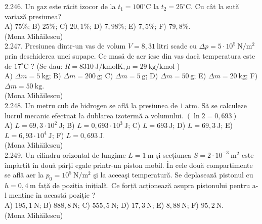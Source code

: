 \documentclass[10pt]{article}
\begin{document}
2.246. Un gaz este răcit izocor de la $t_{1}=100^{\circ} \mathrm{C}$ la $t_{2}=25^{\circ} \mathrm{C}$. Cu cât la sută variază presiunea?\\ A) $75 \%$; B) $25 \%$; C) $20,1 \%$; D) $7,98 \%$; E) $7,5 \%$; F) $79,8 \%$.\\ (Mona Mihǎilescu)\\

2.247. Presiunea dintr-un vas de volum $V=8,31 \mathrm{~litri}$ scade cu $\Delta p=5 \cdot 10^{5} \mathrm{~N} / \mathrm{m}^{2}$ prin deschiderea unei supape. Ce masă de aer iese din vas dacă temperatura este de $17^{\circ} \mathrm{C}$ ? (Se dau: $R=8310 \mathrm{~J} / \mathrm{kmolK}, \mu=29 \mathrm{~kg} / \mathrm{kmol}$ )\\ A) $\Delta m=5 \mathrm{~kg}$; B) $\Delta m=200 \mathrm{~g}$; C) $\Delta m=5 \mathrm{~g}$; D) $\Delta m=50 \mathrm{~g}$; E) $\Delta m=20 \mathrm{~kg}$; F) $\Delta m=50 \mathrm{~kg}$.\\ (Mona Mihǎilescu)\\

2.248. Un metru cub de hidrogen se află la presiunea de $1 \mathrm{~atm}$. Sã se calculeze lucrul mecanic efectuat la dublarea izotermă a volumului. $(\ln 2=0,693)$\\ A) $L=69,3 \cdot 10^{2} \mathrm{~J}$; B) $L=0,693 \cdot 10^{3} \mathrm{~J}$; C) $L=693 \mathrm{~J}$; D) $L=69,3 \mathrm{~J}$; E) $L=6,93 \cdot 10^{4} \mathrm{~J}$; F) $L=0,693 \mathrm{~J}$.\\ (Mona Mihăilescu)\\

2.249. Un cilindru orizontal de lungime $L=1 \mathrm{~m}$ şi secțiunea $S=2 \cdot 10^{-3} \mathrm{~m}^{2}$ este împărțit în două părți egale printr-un piston mobil. În cele două compartimente se află aer la $p_{0}=10^{5} \mathrm{~N} / \mathrm{m}^{2}$ şi la aceeaşi temperatură. Se deplasează pistonul cu $h=0,4 \mathrm{~m}$ față de poziția inițială. Ce forță acționează asupra pistonului pentru a-l menține în această poziție ?\\ A) $195,1 \mathrm{~N}$; B) $888,8 \mathrm{~N}$; C) $555,5 \mathrm{~N}$; D) $17,3 \mathrm{~N}$; E) $8,88 \mathrm{~N}$; F) $95,2 \mathrm{~N}$.\\ (Mona Mihăilescu)\\
\end{document}
